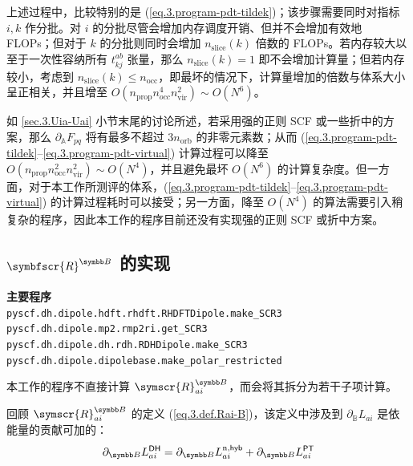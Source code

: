 上述过程中，比较特别的是 (\ref{eq.3.program-pdt-tildek})；该步骤需要同时对指标 $i, k$ 作分批。对 $i$ 的分批尽管会增加内存调度开销、但并不会增加有效地 FLOPs；但对于 $k$ 的分批则同时会增加 $n_\mathrm{slice} (k)$ 倍数的 FLOPs。若内存较大以至于一次性容纳所有 $t_{kj}^{ab}$ 张量，那么 $n_\mathrm{slice} (k) = 1$ 即不会增加计算量；但若内存较小，考虑到 $n_\mathrm{slice} (k) \leqslant n_\mathrm{occ}$，即最坏的情况下，计算量增加的倍数与体系大小呈正相关，并且增至 $O(n_\mathrm{prop} n_{occ}^4 n_\mathrm{vir}^2) \sim O(N^6)$。

如 \ref{sec.3.Uia-Uai} 小节末尾的讨论所述，若采用强的正则 SCF 或一些折中的方案，那么 $\partial_\mathbb{A} F_{pq}$ 将有最多不超过 $3 n_\mathrm{orb}$ 的非零元素数；从而 (\ref{eq.3.program-pdt-tildek}--\ref{eq.3.program-pdt-virtual}) 计算过程可以降至 $O(n_\mathrm{prop} n_\mathrm{occ}^2 n_\mathrm{vir}^2) \sim O(N^4)$，并且避免最坏 $O(N^6)$ 的计算复杂度。但一方面，对于本工作所测评的体系，(\ref{eq.3.program-pdt-tildek}--\ref{eq.3.program-pdt-virtual}) 的计算过程耗时可以接受；另一方面，降至 $O(N^4)$ 的算法需要引入稍复杂的程序，因此本工作的程序目前还没有实现强的正则 SCF 或折中方案。

\subsection{$\symbfscr{R}^\mathbb{B}$ 的实现}

\begin{tcolorbox}
    \textbf{主要程序}\\
    \verb|pyscf.dh.dipole.hdft.rhdft.RHDFTDipole.make_SCR3|\\
    \verb|pyscf.dh.dipole.mp2.rmp2ri.get_SCR3|\\
    \verb|pyscf.dh.dipole.dh.rdh.RDHDipole.make_SCR3|\\
    \verb|pyscf.dh.dipole.dipolebase.make_polar_restricted|
\end{tcolorbox}

本工作的程序不直接计算 $\symscr{R}_{ai}^\mathbb{B}$，而会将其拆分为若干子项计算。

回顾 $\symscr{R}_{ai}^\mathbb{B}$ 的定义 (\ref{eq.3.def.Rai-B})，该定义中涉及到 $\partial_\mathbb{B} L_{ai}$ 是依能量的贡献可加的：
\begin{equation*}
    \partial_\mathbb{B} L_{ai}^\textmt{DH} = \partial_\mathbb{B} L_{ai}^{\mathrm{n}, \textmt{hyb}} + \partial_\mathbb{B} L_{ai}^\textmt{PT}
\end{equation*}

